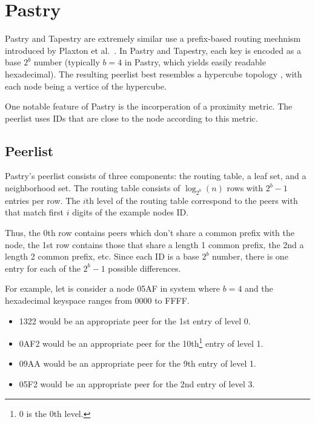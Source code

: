 \section{Pastry}

Pastry \cite{pastry} and Tapestry \cite{tapestry} are extremely similar use a prefix-based routing mechnism introduced by Plaxton et al.\ \cite{plaxton1999accessing}.
In Pastry and Tapestry, each key is encoded as a base $ 2^{b} $ number (typically $b=4$ in Pastry, which yields easily readable hexadecimal).
The resulting peerlist best resembles a hypercube topology \cite{induced}, with each node being a vertice of the hypercube.

One notable feature of Pastry is the incorperation of a proximity metric.
The peerlist uses IDs that are close to the node according to this metric.

\subsection*{Peerlist}
Pastry's peerlist consists of three components: the routing table, a leaf set, and a neighborhood set.  
The routing table consists of $\log_{2^{b}}(n)$ rows with $2^{b} -1 $ entries per row. 
The $i$th level of the routing table correspond to the peers with that match first $i$ digits of the example nodes ID.

Thus, the 0th row contains peers which don't share a common prefix with the node, the 1st row contains those that share a length 1 common prefix, the 2nd a length 2 common prefix, etc.  
Since each ID is a base $2^b$ number, there is one entry for each of the $2^{b} -1 $ possible differences.   

For example, let is consider a node 05AF in system where $b = 4$ and the hexadecimal keyspace ranges from $0000$ to FFFF.
\begin{itemize}
    \item 1322 would be an appropriate peer for the 1st entry of level 0.
    \item 0AF2 would be an appropriate peer for the 10th\footnote{0 is the 0th level.} entry of level 1.
    \item 09AA would be an appropriate peer for the 9th entry of level 1.	
    \item 05F2 would be an appropriate peer for the 2nd entry of level 3.
\end{itemize}


